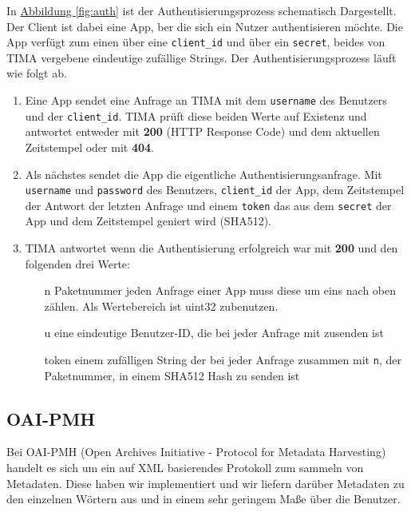 In \hyperref[fig:auth]{Abbildung \ref*{fig:auth}} ist der Authentisierungsprozess schematisch Dargestellt. Der Client ist dabei eine App, ber die sich ein Nutzer authentisieren möchte. Die App verfügt zum einen über eine \texttt{client\_id} und über ein \texttt{secret}, beides von TIMA vergebene eindeutige zufällige Strings. Der Authentisierungsprozess läuft wie folgt ab.
\begin{enumerate}
	\item Eine App sendet eine Anfrage an TIMA mit dem \texttt{username} des Benutzers und der \texttt{client\_id}. TIMA prüft diese beiden Werte auf Existenz und antwortet entweder mit \textbf{200} (HTTP Response Code) und dem aktuellen Zeitstempel oder mit \textbf{404}.
	\item Als nächstes sendet die App die eigentliche Authentisierungsanfrage. Mit \texttt{username} und \texttt{password} des Benutzers, \texttt{client\_id} der App, dem Zeitstempel der Antwort der letzten Anfrage und einem \texttt{token} das aus dem \texttt{secret} der App und dem Zeitstempel geniert wird (SHA512).
	\item TIMA antwortet wenn die Authentisierung erfolgreich war mit \textbf{200} und den folgenden drei Werte:
	\begin{itemize}
		\item[n] Paketnummer jeden Anfrage einer App muss diese um eins nach oben zählen. Als Wertebereich ist uint32 zubenutzen.
		\item[u] eine eindeutige Benutzer-ID, die bei jeder Anfrage mit zusenden ist
		\item[token] einem zufälligen String der bei jeder Anfrage zusammen mit \texttt{n}, der Paketnummer, in einem SHA512 Hash zu senden ist
	\end{itemize}
\end{enumerate}

\subsection{OAI-PMH}
Bei OAI-PMH (Open Archives Initiative - Protocol for Metadata Harvesting) handelt es sich um ein auf XML basierendes Protokoll zum sammeln von Metadaten. Diese haben wir implementiert und wir liefern darüber Metadaten zu den einzelnen Wörtern aus und in einem sehr geringem Maße über die Benutzer.
